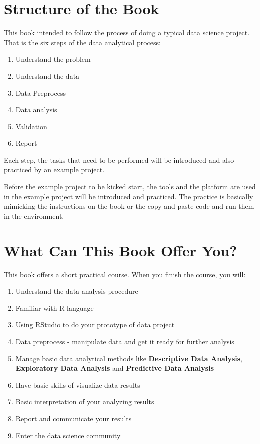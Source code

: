 \documentclass[
]{book}
\providecommand{\tightlist}{%
  \setlength{\itemsep}{0pt}\setlength{\parskip}{0pt}}
\begin{document}
\hypertarget{structure-of-the-book}{%
\section*{Structure of the Book}\label{structure-of-the-book}}


This book intended to follow the process of doing a typical data science project. That is the six steps of the data analytical process:

\begin{enumerate}
\def\labelenumi{\arabic{enumi}.}
\tightlist
\item
  Understand the problem
\item
  Understand the data
\item
  Data Preprocess
\item
  Data analysis
\item
  Validation
\item
  Report
\end{enumerate}

Each step, the tasks that need to be performed will be introduced and also practiced by an example project.

Before the example project to be kicked start, the tools and the platform are used in the example project will be introduced and practiced. The practice is basically mimicking the instructions on the book or the copy and paste code and run them in the environment.

\hypertarget{what-can-this-book-offer-you}{%
\section*{What Can This Book Offer You?}\label{what-can-this-book-offer-you}}


This book offers a short practical course. When you finish the course, you will:

\begin{enumerate}
\def\labelenumi{\arabic{enumi}.}
\tightlist
\item
  Understand the data analysis procedure
\item
  Familiar with R language
\item
  Using RStudio to do your prototype of data project
\item
  Data preprocess - manipulate data and get it ready for further analysis
\item
  Manage basic data analytical methods like \textbf{Descriptive Data Analysis}, \textbf{Exploratory Data Analysis} and \textbf{Predictive Data Analysis}
\item
  Have basic skills of visualize data results
\item
  Basic interpretation of your analyzing results
\item
  Report and communicate your results
\item
  Enter the data science community
\end{enumerate}
\end{document}
